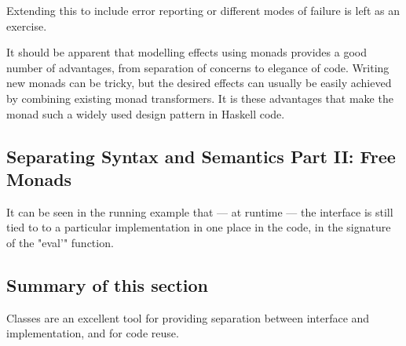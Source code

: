\noindent Extending this to include error reporting or different modes of failure is left as an exercise.

It should be apparent that modelling effects using monads provides a good number of advantages, from separation of concerns to elegance of code. Writing new monads can be tricky, but the desired effects can usually be easily achieved by combining existing monad transformers. It is these advantages that make the monad such a widely used design pattern in Haskell code.

\subsection{Separating Syntax and Semantics Part II: Free Monads}

It can be seen in the running example that --- at runtime --- the interface is still tied to to a particular implementation in one place in the code, in the signature of the "eval'" function. 

\subsection{Summary of this section} Classes are an excellent tool for providing separation between interface and implementation, and for code reuse.


